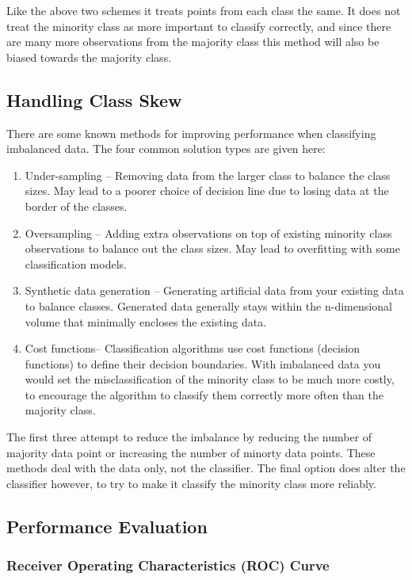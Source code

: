 \documentclass{article}
\begin{document}
Like the above two schemes it treats points from each class the same. It does not treat the minority class as more important to classify correctly, and since there are many more observations from the majority class this method will also be biased towards the majority class.

\subsection{Handling Class Skew}
There are some known methods for improving performance when classifying imbalanced data. The four common solution types are given here:
\begin{enumerate}
\item Under-sampling -- Removing data from the larger class to balance the class sizes.
May lead to a poorer choice of decision line due to losing data at the border of the classes.
\item Oversampling -- Adding extra observations on top of existing minority class observations to balance out the class sizes.
May lead to overfitting with some classification models.
\item Synthetic data generation -- Generating artificial data from your existing data to balance classes.
Generated data generally stays within the n-dimensional volume that minimally encloses the existing data.
\item Cost functions-- Classification algorithms use cost functions (decision functions) to define their decision boundaries.
With imbalanced data you would set the misclassification of the minority class to be much more costly, to encourage the algorithm to classify them correctly more often than the majority class.
\end{enumerate}
The first three attempt to reduce the imbalance by reducing the number of majority data point or increasing the number of minorty data points.
These methods deal with the data only, not the classifier.
The final option does alter the classifier however, to try to make it classify the minority class more reliably.

\subsection{Performance Evaluation}

\subsubsection{Receiver Operating Characteristics (ROC) Curve}
\end{document}
